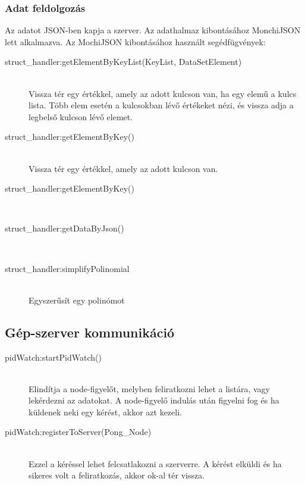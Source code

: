 \subsubsection{Adat feldolgozás}
	Az adatot JSON-ben kapja a szerver. Az adathalmaz kibontásához MonchiJSON lett alkalmazva.
	Az MochiJSON kibontásához használt segédfügvények:
	\begin{description}
	\item[struct\_handler:getElementByKeyList(KeyList, DataSetElement)]
	\hfill \\ Vissza tér egy értékkel, amely az adott kulcson van, ha egy elemű a kulcs lista. Több elem esetén a kulcsokban lévő értékeket nézi, és vissza adja a legbelső kulcson lévő elemet.
	\item[struct\_handler:getElementByKey()]
	\hfill \\ Vissza tér egy értékkel, amely az adott kulcson van.
	\item[struct\_handler:getElementByKey()]
	\hfill \\ 

	\end{description}

	\begin{description}
	\item[struct\_handler:getDataByJson()]
	\hfill \\ 
	\item[struct\_handler:simplifyPolinomial]
	\hfill \\ Egyszerűsít egy polinómot
	\end{description}
\subsection{Gép-szerver kommunikáció}
	\begin{description}
	\item[pidWatch:startPidWatch()]
	\hfill \\ Elindítja a node-figyelőt, melyben feliratkozni lehet a listára, vagy lekérdezni az adatokat. A node-figyelő indulás után figyelni fog és ha küldenek neki egy kérést, akkor azt kezeli. 
	\item[pidWatch:registerToServer(Pong\_Node)]
	\hfill \\ Ezzel a kéréssel lehet felcsatlakozni a szerverre. A kérést elküldi és ha sikeres volt a feliratkozás, akkor ok-al tér vissza.
	\end{description}
